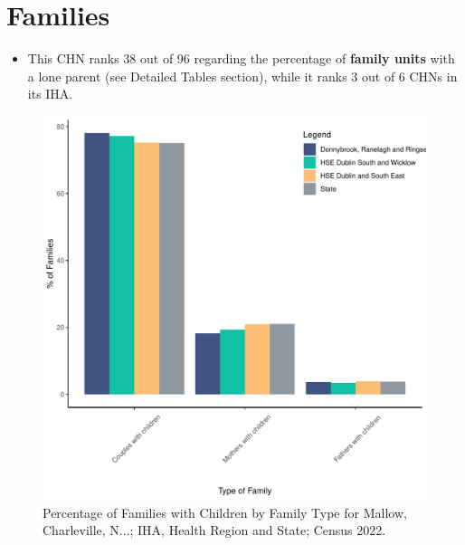 \documentclass{article}
\begin{document}
\section{Families}\label{sect:Fam}
\begin{itemize}
\item This CHN ranks  38 out of 96 regarding the percentage of \textbf{family units} with a lone parent (see Detailed Tables section), while it ranks   3 out of 6 CHNs in its IHA.
\end{itemize}
\begin{figure}[H]
	\centering
	\includegraphics[width = 150mm]{../figures/FamED.pdf}
	\caption{Percentage of Families with Children by Family Type for Mallow, Charleville, N...; IHA, Health Region and State; Census 2022.}
	\label{fig:vbnv}
	\end{figure}
	
\end{document}
